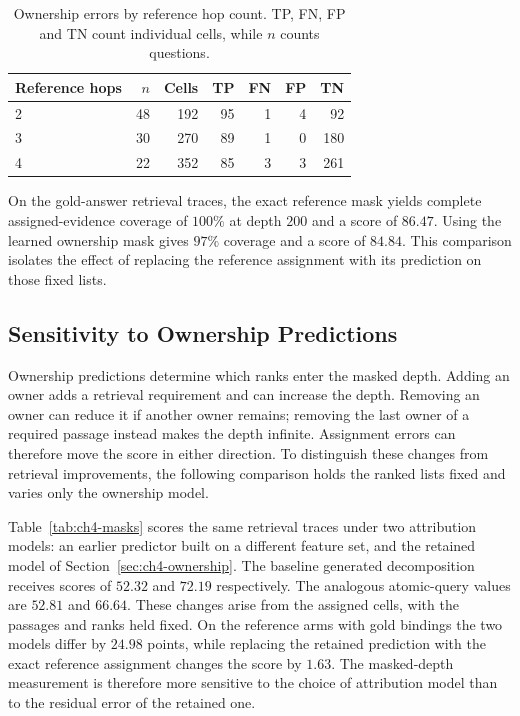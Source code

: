 \begin{table}[htbp]
\centering
\caption{Ownership errors by reference hop count. TP, FN, FP and TN count
individual cells, while $n$ counts questions.}
\label{tab:ch4-cohorts}
\begin{tabular}{lrrrrrr}
\hline
Reference hops & $n$ & Cells & TP & FN & FP & TN \\
\hline
2 & 48 & 192 & 95 & 1 & 4 & 92 \\
3 & 30 & 270 & 89 & 1 & 0 & 180 \\
4 & 22 & 352 & 85 & 3 & 3 & 261 \\
\hline
\end{tabular}
\end{table}

On the gold-answer retrieval traces, the exact reference mask yields complete
assigned-evidence coverage of $100\%$ at depth $200$ and a score of $86.47$.
Using the learned ownership mask gives $97\%$ coverage and a score of
$84.84$. This comparison isolates the effect of replacing the reference
assignment with its prediction on those fixed lists.

\subsection{Sensitivity to Ownership Predictions}

Ownership predictions determine which ranks enter the masked depth. Adding
an owner adds a retrieval requirement and can increase the depth. Removing
an owner can reduce it if another owner remains; removing the last owner of
a required passage instead makes the depth infinite. Assignment errors can
therefore move the score in either direction. To distinguish these changes
from retrieval improvements, the following comparison holds the ranked lists
fixed and varies only the ownership model.

Table~\ref{tab:ch4-masks} scores the same retrieval traces under two
attribution models: an earlier predictor built on a different feature set, and
the retained model of Section~\ref{sec:ch4-ownership}. The baseline generated
decomposition receives scores of $52.32$ and $72.19$ respectively. The analogous atomic-query values
are $52.81$ and $66.64$. These changes arise from the assigned cells, with the
passages and ranks held fixed. On the reference arms with gold bindings the two
models differ by $24.98$ points, while replacing the retained prediction with
the exact reference assignment changes the score by $1.63$. The masked-depth
measurement is therefore more sensitive to the choice of attribution model than
to the residual error of the retained one.

